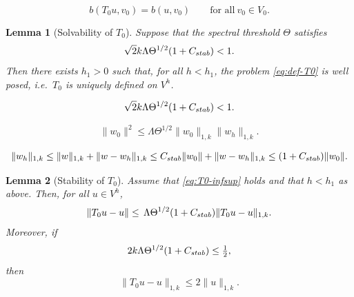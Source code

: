 \documentclass[10pt,a4paper]{amsart}
\newtheorem{lemma}{Lemma}
\newcommand{\Cstab}{C_{\textup{\textsf{stab}}}}
\begin{document}
\begin{equation}\label{eq:def-T0}
	b(T_0 u, v_0) = b(u, v_0) \qquad \text{for all} \ v_0\in V_0.
\end{equation}

\begin{lemma}[Solvability of $T_0$]\label{lem:T0-solv}
Suppose that the spectral threshold $\Theta$ satisfies
\begin{equation}\label{eq:T0-infsup}
	\sqrt{2} k\Lambda\Theta^{1/2}(1+\Cstab) < 1.
\end{equation}
Then there exists $h_1>0$ such that, for all $h<h_1$, the problem \eqref{eq:def-T0} is well posed, 
i.e.\ $T_0$ is uniquely defined on $V^h$.
\end{lemma}

\begin{equation}
	\sqrt{2} k\Lambda\Theta^{1/2}(1+\Cstab) < 1.
\end{equation}

\begin{equation}\label{ml01}
	\|w_0\|^2 \le \Lambda\Theta^{1/2}\|w_0\|_{1, k}\|w_h\|_{1, k}.
\end{equation}

\begin{equation}\label{appl_schatz_wang}
	\|w_h\|_{1,k} \le \|w\|_{1,k} + \|w-w_h\|_{1,k} 
	\le \Cstab\|w_0\| + \|w-w_h\|_{1,k} 
	\le (1+\Cstab)\|w_0\|.
\end{equation}

\begin{lemma}[Stability of $T_0$]\label{lem:T0-stab}
Assume that \eqref{eq:T0-infsup} holds and that $h < h_1$ as above. Then, for all $u\in V^h$,
\begin{equation}\label{eq:T0-L2-energy}
	\|T_0 u - u\| \le \,\Lambda\Theta^{1/2}(1+\Cstab)\|T_0 u - u\|_{1, k} .
\end{equation}
Moreover, if
\begin{equation}\label{eq:T0-extra}
	2k\Lambda\Theta^{1/2}(1+\Cstab) \le \tfrac12,
\end{equation}
then
\begin{equation}\label{eq:T0-energy}
	\|T_0 u - u\|_{1, k} \le 2\|u\|_{1, k}.
\end{equation}
\end{lemma}
\end{document}
